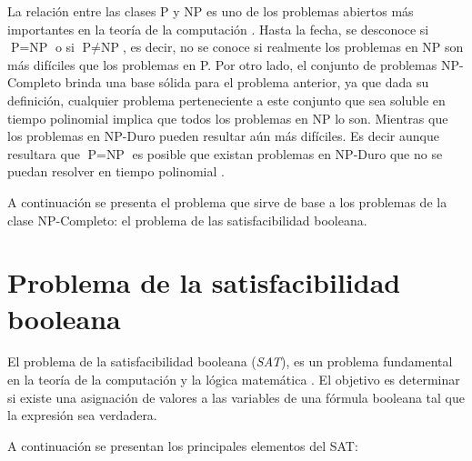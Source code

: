 La relación entre las clases P y NP es uno de los problemas abiertos más importantes en la teoría de la 
computación \cite{authomataTheory}. Hasta la fecha, se desconoce si $\text{P} = \text{NP}$ o si $\text{P}
  \neq \text{NP}$, es decir, no se conoce si realmente los problemas en NP son más difíciles que los problemas en 
P. Por otro lado, el conjunto de problemas NP-Completo brinda una base sólida para el problema anterior, ya 
que dada su definición, cualquier problema perteneciente a este conjunto que sea soluble en tiempo polinomial 
implica que todos los problemas en NP lo son. Mientras que los problemas en NP-Duro pueden resultar aún más 
difíciles. Es decir aunque resultara que $\text{P} = \text{NP}$ es posible que existan problemas en NP-Duro que no se puedan resolver en tiempo polinomial \cite{authomataTheory}.

A continuación se presenta el problema que sirve de base a los problemas de la clase NP-Completo: el problema de las satisfacibilidad
booleana.

\section{Problema de la satisfacibilidad booleana}

El problema de la satisfacibilidad booleana (\textit{SAT}), es un problema fundamental en la teoría de la computación y la lógica matemática \cite{authomataTheory}. El objetivo es determinar si existe una asignación de valores a las variables de una fórmula booleana tal que la expresión sea verdadera.

A continuación se presentan los principales elementos del SAT:

